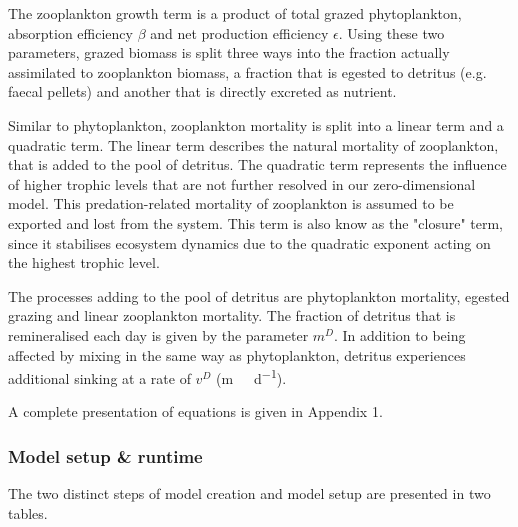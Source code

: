 \documentclass[journal abbreviations, manuscript]{copernicus}
\begin{document}
The zooplankton growth term is a product of total grazed phytoplankton, absorption efficiency $\beta$ and net production efficiency $\epsilon$. Using these two parameters, grazed biomass is split three ways into the fraction actually assimilated to zooplankton biomass, a fraction that is egested to detritus (e.g. faecal pellets) and another that is directly excreted as nutrient. 

Similar to phytoplankton, zooplankton mortality is split into a linear term and a quadratic term. The linear term describes the natural mortality of zooplankton, that is added to the pool of detritus. The quadratic term represents the influence of higher trophic levels that are not further resolved in our zero-dimensional model. This predation-related mortality of zooplankton is assumed to be exported and lost from the system.
This term is also know as the "closure" term, since it stabilises ecosystem dynamics due to the quadratic exponent acting on the highest trophic level.

The processes adding to the pool of detritus are phytoplankton mortality, egested grazing and linear zooplankton mortality. The fraction of detritus that is remineralised each day is given by the parameter $m
^D$. In addition to being affected by mixing in the same way as phytoplankton, detritus experiences additional sinking at a rate of $v^D$ (\unit{m \ d^{-1}}).

A complete presentation of equations is given in Appendix 1.

\clearpage

\subsubsection{Model setup \& runtime}
The two distinct steps of model creation and model setup are presented in two tables. 
\end{document}
